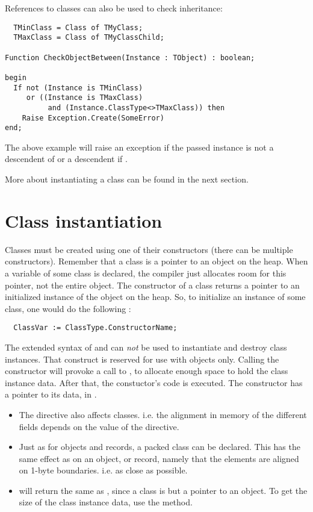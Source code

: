 References to classes can also be used to check inheritance:
\begin{verbatim}
  TMinClass = Class of TMyClass;
  TMaxClass = Class of TMyClassChild;

Function CheckObjectBetween(Instance : TObject) : boolean;

begin
  If not (Instance is TMinClass) 
     or ((Instance is TMaxClass) 
          and (Instance.ClassType<>TMaxClass)) then
    Raise Exception.Create(SomeError)
end;
\end{verbatim}
The above example will raise an exception if the passed instance
is not a descendent of  or a descendent if .

More about instantiating a class can be found in the next section.

\section{Class instantiation}
Classes must be created using one of their constructors (there can be
multiple constructors). Remember that a class is a pointer to an object on
the heap. When a variable of some class is declared, the compiler just 
allocates room for this pointer, not the entire object. The constructor of
a class returns a pointer to an initialized instance of the object on the
heap. So, to initialize an instance of some class, one would do the following :
\begin{verbatim}
  ClassVar := ClassType.ConstructorName;
\end{verbatim}
The extended syntax of  and  can {\em not} be used to
instantiate and destroy class instances.
That construct is reserved for use with objects only.
Calling the constructor will provoke a call to , to allocate
enough space to hold the class instance data.
After that, the constuctor's code is executed.
The constructor has a pointer to its data, in .

\begin{remark}
\begin{itemize}
\item The  directive also affects classes.
i.e. the alignment in memory of the different fields depends on the
value of  the  directive.
\item Just as for objects and records, a packed class can be declared.
This has the same effect as on an object, or record, namely that the
elements are aligned on 1-byte boundaries. i.e. as close as possible.
\item {} will return the same as , 
since a class is but a pointer to an object. To get the size of the class 
instance data, use the  method.
\end{itemize}
\end{remark}

